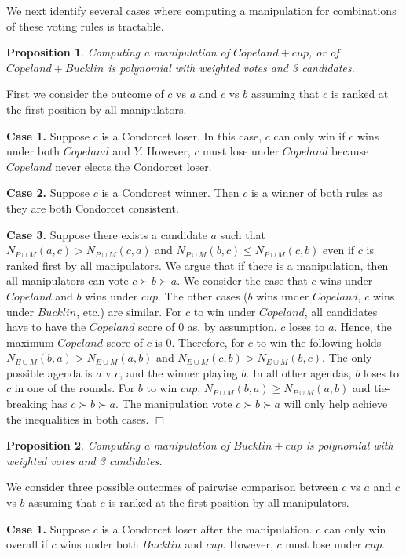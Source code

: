 \documentclass{ecai2012}
\newcommand{\winner}[2]{\mbox{$#1 + #2$}}
\newtheorem{proposition}{Proposition}
\newcommand{\myproof}{\vspace{-3mm}\noindent {\bf Proof:\ \ }}
\newcommand{\myqed}{\mbox{$\Box$}}
\begin{document}
We next identify several cases where computing
a manipulation for combinations of
these voting rules is tractable.

\begin{proposition}
Computing a manipulation of $\winner{Copeland}{cup}$,
or of $\winner{Copeland}{Bucklin}$
is polynomial with
weighted votes and 3 candidates.
\end{proposition}
\myproof
First we consider the outcome of
$c$ vs $a$ and $c$ vs $b$
assuming that $c$ is ranked at the first position
by all manipulators.

{\bf Case 1.} Suppose $c$ is a Condorcet loser.
In this case, $c$ can only win
if $c$ wins under both $Copeland$ and $Y$.
However, $c$ must lose under $Copeland$ because
$Copeland$ never elects the Condorcet loser.

{\bf Case 2.}
Suppose $c$ is a Condorcet winner.
Then $c$ is a winner of both rules as they are
both Condorcet consistent.

{\bf Case 3.} Suppose there exists a candidate $a$ such that
$N_{P \cup M}(a,c) > N_{P \cup M}(c,a)$ and
$N_{P \cup M}(b,c) \leq N_{P \cup M}(c,b)$
even if $c$ is ranked first by all manipulators.
We argue that if there is a manipulation,
then all manipulators can vote $c \succ b \succ a$. We
consider the case that $c$ wins under $Copeland$
and $b$ wins under $cup$. The other cases ($b$ wins
under $Copeland$, $c$ wins under $Bucklin$, etc.) are
similar.
For $c$ to win under $Copeland$,
all candidates
have to have the $Copeland$ score of 0 as, by assumption,
$c$ loses to $a$. Hence, the maximum $Copeland$
score of $c$ is $0$. Therefore,
for $c$ to win  the following holds
$N_{E \cup M}(b,a) > N_{E \cup M}(a,b)$
and $N_{E \cup M}(c,b) > N_{E \cup M}(b,c)$.
The only possible agenda is $a$ v $c$, and the winner
playing $b$. In all other agendas, $b$ loses to $c$
in one of the rounds. For $b$ to win $cup$,
$N_{P \cup M}(b,a) \geq N_{P \cup M}(a,b)$ and tie-breaking
has $c \succ b \succ a$.
The manipulation vote $c \succ b \succ a$ will only help achieve
the inequalities in both cases.
\myqed

\begin{proposition}
Computing a manipulation of $\winner{Bucklin}{cup}$
is polynomial with weighted votes and 3 candidates.
\end{proposition}
\myproof
We consider three possible outcomes of pairwise
comparison between $c$ vs $a$ and $c$ vs $b$
assuming that $c$ is ranked at the first position
by all manipulators.

{\bf Case 1.} Suppose $c$ is a Condorcet loser after
the manipulation. $c$ can only win overall
if $c$ wins under both  $Bucklin$ and $cup$.
However, $c$ must lose under $cup$.
\end{document}
